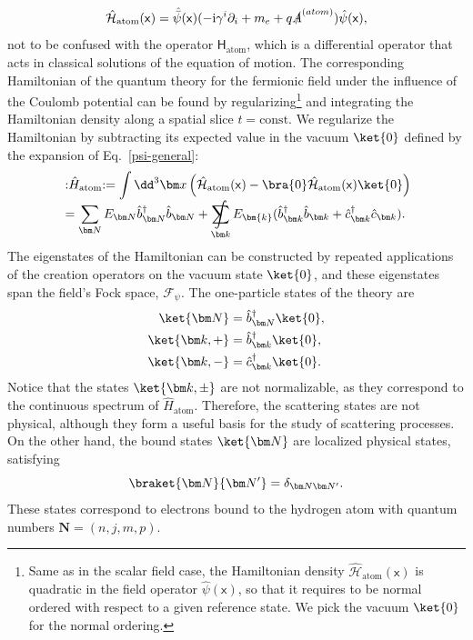 \documentclass[letterpaper,12pt,titlepage,oneside,final]{book}
\newcommand{\normord}[1]{\vcentcolon\mathrel{#1}\vcentcolon}
\providecommand{\vcentcolon}{\mathrel{\mathop{:}}}
\newcommand{\mf}{\mathsf}%
\newcommand{\ii}{\mathrm{i}}
\DeclareMathOperator*{\sumint}{%
\mathchoice%
  {\ooalign{$\displaystyle\sum$\cr\hidewidth$\displaystyle\int$\hidewidth\cr}}
  {\ooalign{\raisebox{.14\height}{\scalebox{.7}{$\textstyle\sum$}}\cr\hidewidth$\textstyle\int$\hidewidth\cr}}
  {\ooalign{\raisebox{.2\height}{\scalebox{.6}{$\scriptstyle\sum$}}\cr$\scriptstyle\int$\cr}}
  {\ooalign{\raisebox{.2\height}{\scalebox{.6}{$\scriptstyle\sum$}}\cr$\scriptstyle\int$\cr}}
}
\begin{document}
\begin{equation}
    \hat{\mathcal{H}}_{\text{atom}}(\mf x) = \hat{\bar{\psi}}(\mf x)(-\ii\gamma^i\partial_i + m_e + q \slashed{A}^{\text(atom)})\hat{\psi}(\mf{x}),
\end{equation}
not to be confused with the operator $\mf{H}_\text{atom}$, which is a differential operator that acts in classical solutions of the equation of motion. The corresponding Hamiltonian of the quantum theory for the fermionic field under the influence of the Coulomb potential can be found by regularizing\footnote{Same as in the scalar field case, the Hamiltonian density $\hat{\mathcal{H}}_\text{atom}(\mf x)$ is quadratic in the field operator $\hat{\psi}(\mf x)$, so that it requires to be normal ordered with respect to a given reference state. We pick the vacuum $\ket{0}$ for the normal ordering.} and integrating the Hamiltonian density along a spatial slice $t = \text{const.}$ We regularize the Hamiltonian by subtracting its expected value in the vacuum $\ket{0}$ defined by the expansion of Eq.~\eqref{psi-general}:
\begin{align}\label{H-atom-quantized}
    &\normord{\hat{H}_{\text{atom}}} = \int \dd^3 \bm x\, \Big(\hat{\mathcal{H}}_{\text{atom}}(\mf x) - \bra{0}\hat{\mathcal{H}}_{\text{atom}}(\mf x)\ket{0} \Big) \nonumber \\
    &= \sum_{\bm N} E_{\bm N}\hat{b}^\dagger_{\bm N}\hat{b}_{\bm N} + \sumint_{\bm k} E_{\bm{k}} (\hat{b}_{\bm k}^\dagger\hat{b}_{\bm k} + \hat{c}_{\bm k}^\dagger\hat{c}_{\bm k}).
\end{align}
The eigenstates of the Hamiltonian can be constructed by repeated applications of the creation operators on the vacuum state $\ket{0}$, and these eigenstates span the field's Fock space, $\mathcal{F}_\psi$. The one-particle states of the theory are
\begin{align}
    \ket{\bm N} &= \hat{b}_{\bm N}^\dagger \ket{0},\\
    \ket{\bm k,+} &= \hat{b}_{\bm k}^\dagger \ket{0},\\
    \ket{\bm k,-} &= \hat{c}_{\bm k}^\dagger \ket{0}.
\end{align}
Notice that the states $\ket{\bm k,\pm}$ are not normalizable, as they correspond to the continuous spectrum of $\hat{{H}}_\text{atom}$. Therefore, the scattering states are not physical, although they form a useful basis for the study of scattering processes. On the other hand, the bound states $\ket{\bm N}$ are localized physical states, satisfying
\begin{equation}\label{eq:wearenotparticlephysicists}
    \braket{\bm N}{\bm N'} = \delta_{\bm N\bm N'}.
\end{equation}
These states correspond to electrons bound to the hydrogen atom with quantum numbers $\bm N = (n,j,m,p)$.
\end{document}

